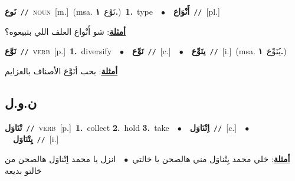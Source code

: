 \documentclass[10pt,a4paper,twoside]{article} %
\begin{document}
\begin{multicols}{2}
{\setlength\topsep{0pt}\textbf{\foreignlanguage{arabic}{نَوع}}\ {\color{gray}\texttt{//}\color{black}}\ \textsc{noun}\ [m.]\ \color{gray}(msa. \foreignlanguage{arabic}{نَوْع}~\foreignlanguage{arabic}{\textbf{١.}})\color{black}\ \textbf{1.}~type\ \ $\bullet$\ \ \setlength\topsep{0pt}\textbf{\foreignlanguage{arabic}{أَنْوَاع}}\ {\color{gray}\texttt{//}\color{black}}\ [pl.]\  \begin{flushright}\color{gray}\foreignlanguage{arabic}{\textbf{\underline{\foreignlanguage{arabic}{أمثلة}}}: شو أَنْواع العلف اللي بتبيعوه؟}\end{flushright}\color{black}} \vspace{2mm}

{\setlength\topsep{0pt}\textbf{\foreignlanguage{arabic}{نَوَّع}}\ {\color{gray}\texttt{//}\color{black}}\ \textsc{verb}\ [p.]\ \textbf{1.}~diversify\ \ $\bullet$\ \ \setlength\topsep{0pt}\textbf{\foreignlanguage{arabic}{نَوِّع}}\ {\color{gray}\texttt{//}\color{black}}\ [c.]\ \ $\bullet$\ \ \setlength\topsep{0pt}\textbf{\foreignlanguage{arabic}{ينَوِّع}}\ {\color{gray}\texttt{//}\color{black}}\ [i.]\ \color{gray}(msa. \foreignlanguage{arabic}{يُنَوِّع}~\foreignlanguage{arabic}{\textbf{١.}})\color{black}\  \begin{flushright}\color{gray}\foreignlanguage{arabic}{\textbf{\underline{\foreignlanguage{arabic}{أمثلة}}}: بحب أنَوَّع الأصناف بالعزايم}\end{flushright}\color{black}} \vspace{2mm}

\vspace{-3mm}
\subsection*{\color{blue}\foreignlanguage{arabic}{ن.و.ل}\color{blue}{}} 

{\setlength\topsep{0pt}\textbf{\foreignlanguage{arabic}{تْنَاوَل}}\ {\color{gray}\texttt{//}\color{black}}\ \textsc{verb}\ [p.]\ \textbf{1.}~collect  \textbf{2.}~hold  \textbf{3.}~take\ \ $\bullet$\ \ \setlength\topsep{0pt}\textbf{\foreignlanguage{arabic}{اِتْنَاوَل}}\ {\color{gray}\texttt{//}\color{black}}\ [c.]\ \ $\bullet$\ \ \setlength\topsep{0pt}\textbf{\foreignlanguage{arabic}{يِتْنَاوَل}}\ {\color{gray}\texttt{//}\color{black}}\ [i.]\  \begin{flushright}\color{gray}\foreignlanguage{arabic}{\textbf{\underline{\foreignlanguage{arabic}{أمثلة}}}: خلي محمد يِتْناوَل مني هالصحن يا خالتي\ $\bullet$\ \  انزل يا محمد اِتْناوَل هالصحن من خالتو بديعة}\end{flushright}\color{black}} \vspace{2mm}


\end{multicols}
\end{document}
